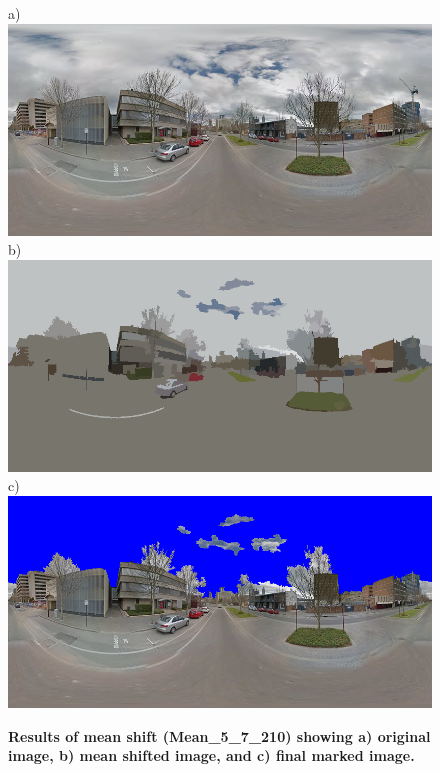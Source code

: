 \documentclass[final,3p,times,authoryear]{elsarticle}
\begin{document}
\begin{figure}
\centering    
a)\includegraphics[scale=0.25]{Images/panorama-ESuX4xmQ_fDc50NK6CnfZQ-1_cropped.png} 
b)\includegraphics[scale=0.25]{Images/panorama-ESuX4xmQ_fDc50NK6CnfZQ-1_seg.png} 
c)\includegraphics[scale=0.25]{Images/panorama-ESuX4xmQ_fDc50NK6CnfZQ-1_ms_sky_mark.png} 
\caption{\bf Results of mean shift (Mean\_5\_7\_210) showing a) original image, b) mean shifted image, and c) final marked image.}    
 \label{fig:meanresults}  
\end{figure} 
\end{document}
